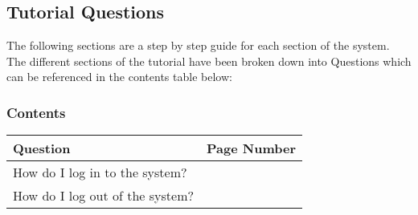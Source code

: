 \subsection{Tutorial Questions}
The following sections are a step by step guide for each section of the system. The different sections of the tutorial have been broken down into Questions which can be referenced in the contents table below:

\pagebreak
\subsubsection{Contents}

\begin{center}
    \begin{longtable}{|p{8cm}|p{3cm}|}
        \hline
	 \textbf{Question} & \textbf{Page Number} \\ \hline
	How do I log in to the system? & \pageref{fig:Logging into the system} \\ \hline
	How do I log out of the system? & \pageref{fig:Logging out of the system} \\ \hline


\end{longtable}
\end{center}
